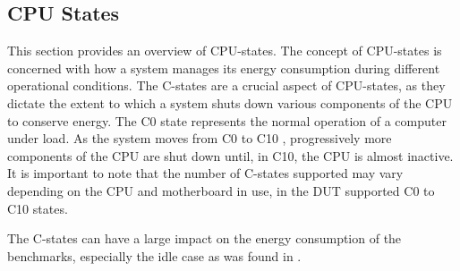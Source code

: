 \subsection{CPU States}\label{subsec:cpustates}

This section provides an overview of CPU-states. The concept of CPU-states is concerned with how a system manages its energy consumption during different operational conditions. The C-states are a crucial aspect of CPU-states, as they dictate the extent to which a system shuts down various components of the CPU to conserve energy. The C0 state represents the normal operation of a computer under load.\cite{CIntel,CHard} As the system moves from C0 to C10 \cite{biksbois}, progressively more components of the CPU are shut down until, in C10, the CPU is almost inactive. It is important to note that the number of C-states supported may vary depending on the CPU and motherboard in use, in \cite{biksbois} the DUT supported C0 to C10 states.


The C-states can have a large impact on the energy consumption of the benchmarks, especially the idle case as was found in \cite{biksbois}.
